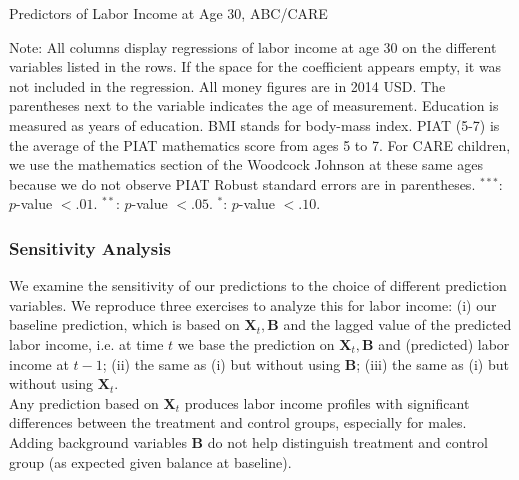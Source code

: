 \begin{table} 
\begin{threeparttable}
\caption{Predictors of Labor Income at Age 30, ABC/CARE}
\label{table:predabc}
\centering 
\footnotesize

\begin{tablenotes}
\footnotesize
\item Note: All columns display regressions of labor income at age 30 on the different variables listed in the rows. If the space for the coefficient appears empty, it was not included in the regression. All money figures are in 2014 USD. The parentheses next to the variable indicates the age of measurement. Education is measured as years of education. BMI stands for body-mass index. PIAT (5-7) is the average of the PIAT mathematics score from ages 5 to 7. For CARE children, we use the mathematics section of the Woodcock Johnson at these same ages because we do not observe PIAT Robust standard errors are in parentheses. $^{***}$: $p$-value $< .01$. $^{**}$: $p$-value $< .05$. $^{*}$: $p$-value $< .10$.
\end{tablenotes}
\end{threeparttable}
\end{table}

\subsubsection{Sensitivity Analysis}

\noindent We examine the sensitivity of our predictions to the choice of different prediction variables. We reproduce three exercises to analyze this for labor income: (i) our baseline prediction, which is based on $\bm{X}_{t}, \bm{B}$ and the lagged value of the predicted labor income, i.e. at time $t$ we base the prediction on $\bm{X}_{t}, \bm{B}$ and (predicted) labor income at $t-1$; (ii) the same as (i) but without using $\bm{B}$; (iii) the same as (i) but without using $\bm{X}_{t}$.\\

\noindent Any prediction based on $\bm{X}_{t}$ produces labor income profiles with significant differences between the treatment and control groups, especially for males. Adding background variables $\bm{B}$ do not help distinguish treatment and control group (as expected given balance at baseline).

